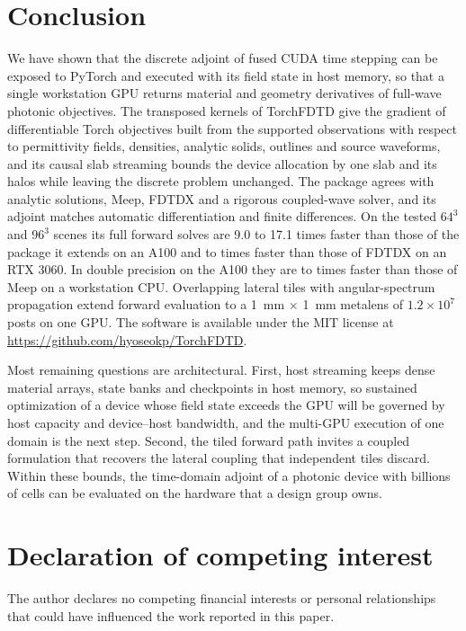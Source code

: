 \documentclass[11pt,a4paper]{article}
\begin{document}
\section{Conclusion}

We have shown that the discrete adjoint of fused CUDA time stepping can be exposed to PyTorch and executed with its field state in host memory, so that a single workstation GPU returns material and geometry derivatives of full-wave photonic objectives. The transposed kernels of TorchFDTD give the gradient of differentiable Torch objectives built from the supported observations with respect to permittivity fields, densities, analytic solids, outlines and source waveforms, and its causal slab streaming bounds the device allocation by one slab and its halos while leaving the discrete problem unchanged. The package agrees with analytic solutions, Meep, FDTDX and a rigorous coupled-wave solver, and its adjoint matches automatic differentiation and finite differences. On the tested $64^3$ and $96^3$ scenes its full forward solves are 9.0 to 17.1 times faster than those of the package it extends on an A100 and \CrossFdtdxFullMin{} to \CrossFdtdxFullMax{} times faster than those of FDTDX on an RTX 3060. In double precision on the A100 they are \PrecisionRatioMin{} to \PrecisionRatioMax{} times faster than those of Meep on a workstation CPU. Overlapping lateral tiles with angular-spectrum propagation extend forward evaluation to a 1~mm $\times$ 1~mm metalens of $1.2\times10^{7}$ posts on one GPU. The software is available under the MIT license at \url{https://github.com/hyoseokp/TorchFDTD}.

Most remaining questions are architectural. First, host streaming keeps dense material arrays, state banks and checkpoints in host memory, so sustained optimization of a device whose field state exceeds the GPU will be governed by host capacity and device--host bandwidth, and the multi-GPU execution of one domain is the next step. Second, the tiled forward path invites a coupled formulation that recovers the lateral coupling that independent tiles discard. Within these bounds, the time-domain adjoint of a photonic device with billions of cells can be evaluated on the hardware that a design group owns.

\section*{Declaration of competing interest}

The author declares no competing financial interests or personal relationships that could have influenced the work reported in this paper.
\end{document}
